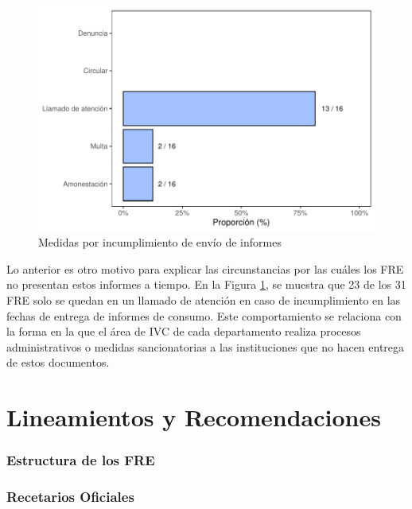 \documentclass[
]{book}
\begin{document}
\begin{figure}

{\centering \includegraphics[width=0.85\linewidth]{InformeFinal_files/figure-latex/IncumplimientoEnvioInformes-1} 

}

\caption{Medidas por incumplimiento de envío de informes}\label{fig:IncumplimientoEnvioInformes}
\end{figure}

Lo anterior es otro motivo para explicar las circunstancias por las cuáles los FRE no presentan estos informes a tiempo. En la Figura \ref{fig:IncumplimientoEnvioInformes}, se muestra que 23 de los 31 FRE solo se quedan en un llamado de atención en caso de incumplimiento en las fechas de entrega de informes de consumo. Este comportamiento se relaciona con la forma en la que el área de IVC de cada departamento realiza procesos administrativos o medidas sancionatorias a las instituciones que no hacen entrega de estos documentos.

\hypertarget{lineamientos-y-recomendaciones}{%
\chapter{Lineamientos y Recomendaciones}\label{lineamientos-y-recomendaciones}}

\hypertarget{estructura-de-los-fre}{%
\subsection{Estructura de los FRE}\label{estructura-de-los-fre}}

\hypertarget{recetarios-oficiales-1}{%
\subsection{Recetarios Oficiales}\label{recetarios-oficiales-1}}
\end{document}
